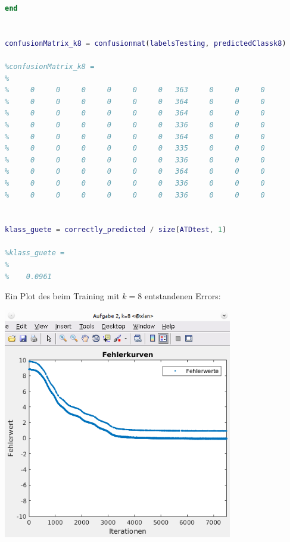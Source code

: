 \documentclass[12pt]{article}
\begin{document}
\begin{lstlisting}[language=Matlab]
end


confusionMatrix_k8 = confusionmat(labelsTesting, predictedClassk8)

%confusionMatrix_k8 =
%
%     0     0     0     0     0     0   363     0     0     0
%     0     0     0     0     0     0   364     0     0     0
%     0     0     0     0     0     0   364     0     0     0
%     0     0     0     0     0     0   336     0     0     0
%     0     0     0     0     0     0   364     0     0     0
%     0     0     0     0     0     0   335     0     0     0
%     0     0     0     0     0     0   336     0     0     0
%     0     0     0     0     0     0   364     0     0     0
%     0     0     0     0     0     0   336     0     0     0
%     0     0     0     0     0     0   336     0     0     0


klass_guete = correctly_predicted / size(ATDtest, 1)

%klass_guete =
%
%    0.0961
\end{lstlisting}
Ein Plot des beim Training mit $k = 8$ entstandenen Errors:\\
\begin{center}
\includegraphics[width=10cm]{Bilder/errorplot_aufg2_k8.png}
\end{center}
\newpage
\end{document}
